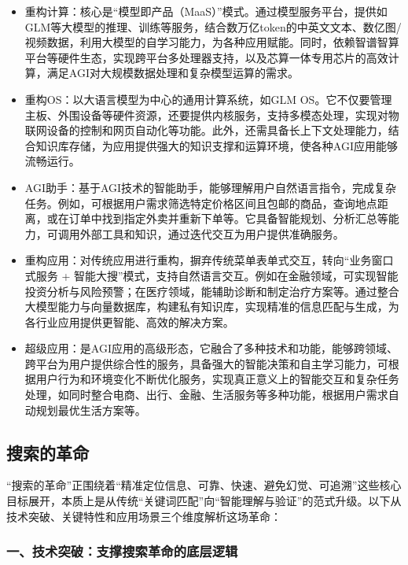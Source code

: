 \begin{itemize}
	\item 重构计算：核心是“模型即产品（MaaS）”模式。通过模型服务平台，提供如GLM等大模型的推理、训练等服务，结合数万亿token的中英文文本、数亿图/视频数据，利用大模型的自学习能力，为各种应用赋能。同时，依赖智谱智算平台等硬件生态，实现跨平台多处理器支持，以及芯算一体专用芯片的高效计算，满足AGI对大规模数据处理和复杂模型运算的需求。
	\item 重构OS：以大语言模型为中心的通用计算系统，如GLM OS。它不仅要管理主板、外围设备等硬件资源，还要提供内核服务，支持多模态处理，实现对物联网设备的控制和网页自动化等功能。此外，还需具备长上下文处理能力，结合知识库存储，为应用提供强大的知识支撑和运算环境，使各种AGI应用能够流畅运行。
	\item AGI助手：基于AGI技术的智能助手，能够理解用户自然语言指令，完成复杂任务。例如，可根据用户需求筛选特定价格区间且包邮的商品，查询地点距离，或在订单中找到指定外卖并重新下单等。它具备智能规划、分析汇总等能力，可调用外部工具和知识，通过迭代交互为用户提供准确服务。
	\item 重构应用：对传统应用进行重构，摒弃传统菜单表单式交互，转向“业务窗口式服务 + 智能大搜”模式，支持自然语言交互。例如在金融领域，可实现智能投资分析与风险预警；在医疗领域，能辅助诊断和制定治疗方案等。通过整合大模型能力与向量数据库，构建私有知识库，实现精准的信息匹配与生成，为各行业应用提供更智能、高效的解决方案。
	\item 超级应用：是AGI应用的高级形态，它融合了多种技术和功能，能够跨领域、跨平台为用户提供综合性的服务，具备强大的智能决策和自主学习能力，可根据用户行为和环境变化不断优化服务，实现真正意义上的智能交互和复杂任务处理，如同时整合电商、出行、金融、生活服务等多种功能，根据用户需求自动规划最优生活方案等。
\end{itemize}

\subsection{搜索的革命}

“搜索的革命”正围绕着“精准定位信息、可靠、快速、避免幻觉、可追溯”这些核心目标展开，本质上是从传统“关键词匹配”向“智能理解与验证”的范式升级。以下从技术突破、关键特性和应用场景三个维度解析这场革命：

\subsubsection*{一、技术突破：支撑搜索革命的底层逻辑}

